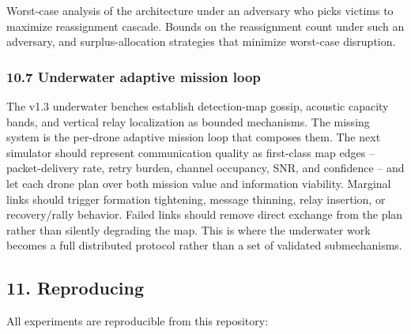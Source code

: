 Worst-case analysis of the architecture under an adversary who picks
victims to maximize reassignment cascade. Bounds on the reassignment
count under such an adversary, and surplus-allocation strategies that
minimize worst-case disruption.

\subsubsection{10.7 Underwater adaptive mission
loop}\label{underwater-adaptive-mission-loop}

The v1.3 underwater benches establish detection-map gossip, acoustic
capacity bands, and vertical relay localization as bounded mechanisms.
The missing system is the per-drone adaptive mission loop that composes
them. The next simulator should represent communication quality as
first-class map edges -- packet-delivery rate, retry burden, channel
occupancy, SNR, and confidence -- and let each drone plan over both
mission value and information viability. Marginal links should trigger
formation tightening, message thinning, relay insertion, or
recovery/rally behavior. Failed links should remove direct exchange from
the plan rather than silently degrading the map. This is where the
underwater work becomes a full distributed protocol rather than a set of
validated submechanisms.

\subsection{11. Reproducing}\label{reproducing}

All experiments are reproducible from this repository:

